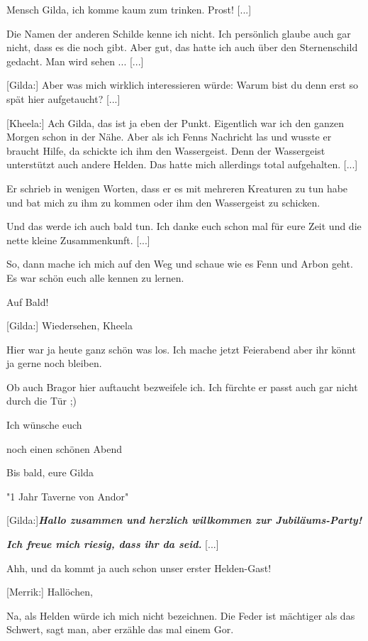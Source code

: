 \documentclass[10pt, a4paper, oneside]{book}
\begin{document}
\begin{multicols}{2}
Mensch Gilda, ich komme kaum zum trinken. Prost! [...]

Die Namen der anderen Schilde kenne ich nicht. Ich persönlich glaube auch gar nicht, dass es die noch gibt. Aber gut, das hatte ich auch über den Sternenschild gedacht. Man wird sehen ... [...]

[Gilda:] Aber was mich wirklich interessieren würde: Warum bist du denn erst so spät hier aufgetaucht? [...]

[Kheela:] Ach Gilda, das ist ja eben der Punkt. Eigentlich war ich den ganzen Morgen schon in der Nähe. Aber als ich Fenns Nachricht las und wusste er braucht Hilfe, da schickte ich ihm den Wassergeist. Denn der Wassergeist unterstützt auch andere Helden. Das hatte mich allerdings total aufgehalten. [...]

Er schrieb in wenigen Worten, dass er es mit mehreren Kreaturen zu tun habe und bat mich zu ihm zu kommen oder ihm den Wassergeist zu schicken.

Und das werde ich auch bald tun. Ich danke euch schon mal für eure Zeit und die nette kleine Zusammenkunft. [...]

So, dann mache ich mich auf den Weg und schaue wie es Fenn und Arbon geht.
Es war schön euch alle kennen zu lernen.

Auf Bald!

[Gilda:] Wiedersehen, Kheela

Hier war ja heute ganz schön was los. Ich mache jetzt Feierabend aber ihr könnt ja gerne noch bleiben.

Ob auch Bragor hier auftaucht bezweifele ich. Ich fürchte er passt auch gar nicht durch die Tür ;)

Ich wünsche euch

noch einen schönen Abend

Bis bald, eure Gilda

\begin{center}
    "1 Jahr Taverne von Andor"
\end{center}

[Gilda:]\textbf{\textit{Hallo zusammen und herzlich willkommen zur Jubiläums-Party!}}

\textit{\textbf{Ich freue mich riesig, dass ihr da seid.}} [...]

Ahh, und da kommt ja auch schon unser erster Helden-Gast!

[Merrik:] Hallöchen,

Na, als Helden würde ich mich nicht bezeichnen. Die Feder ist mächtiger als das Schwert, sagt man, aber erzähle das mal einem Gor.


\end{multicols}
\end{document}
